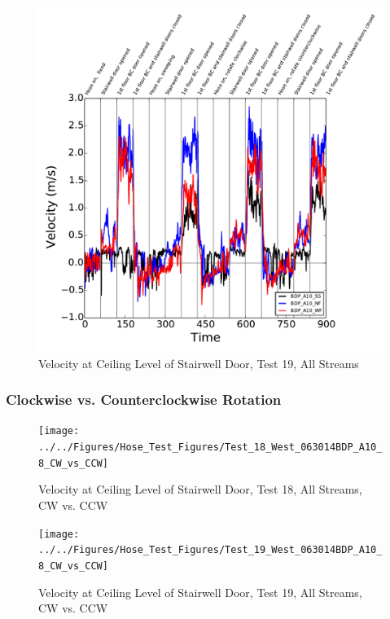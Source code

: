 \documentclass[12pt,oneside]{book}
\begin{document}
\begin{figure}[!ht]
\includegraphics[width=6in]{../../Figures/Hose_Test_Figures/Test_19_West_063014BDP_A10_8_All_Streams}
\caption{Velocity at Ceiling Level of Stairwell Door, Test 19, All Streams}
\label{fig:Test_19_West_063014_SS_BDP_A10}
\end{figure}

\clearpage

\subsubsection{Clockwise vs. Counterclockwise Rotation}

\begin{figure}[!ht]
\texttt{[image: ../../Figures/Hose\_Test\_Figures/Test\_18\_West\_063014BDP\_A10\_8\_CW\_vs\_CCW]}
\caption{Velocity at Ceiling Level of Stairwell Door, Test 18, All Streams, CW vs. CCW}
\label{fig:Test_18_West_063014_SS_BDP_A10}
\end{figure}

\begin{figure}[!ht]
\texttt{[image: ../../Figures/Hose\_Test\_Figures/Test\_19\_West\_063014BDP\_A10\_8\_CW\_vs\_CCW]}
\caption{Velocity at Ceiling Level of Stairwell Door, Test 19, All Streams, CW vs. CCW}
\label{fig:Test_19_West_063014_SS_BDP_A10}
\end{figure}
\end{document}
